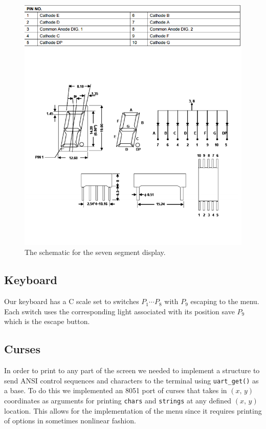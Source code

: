 \documentclass[12pt]{article}
\newcommand{\shellcmd}[1]{\texttt{\colorbox{gray!30}{#1}}}
\begin{document}
\begin{figure}[!ht]
    \includegraphics[width=\textwidth]{assets/scematic}
    \caption{The schematic for the seven segment display.}
    \label{schematic}
\end{figure}

\subsection{Keyboard}
Our keyboard has a C scale set to switches $P_1 \cdots P_8$ with $P_9$ escaping to the menu. Each switch uses the corresponding light associated with its position save $P_9$ which is the escape button.

\subsection{Curses}
In order to print to any part of the screen we needed to implement a structure to send ANSI control sequences and characters to the terminal using \shellcmd{uart\_get()} as a base. To do this we implemented an \num{8051} port of curses that takes in $(x,\, y)$ coordinates as arguments for printing \shellcmd{chars} and \shellcmd{strings} at any defined $(x,\, y)$ location. This allows for the implementation of the menu since it requires printing of options in sometimes nonlinear fashion.
\end{document}
